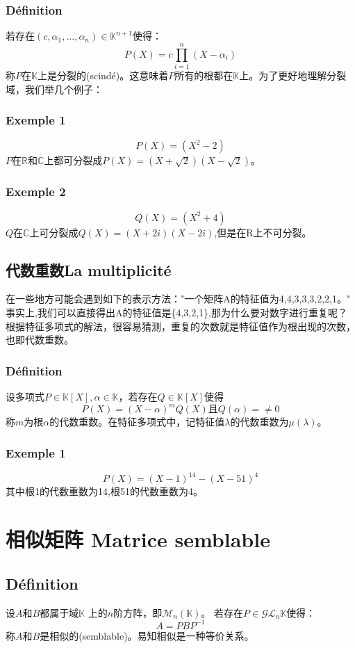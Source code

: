 \documentclass[12pt, a4paper, oneside]{ctexbook}
\begin{document}
  \subsubsection{Définition}
  若存在$(c,\alpha_1,\dots,\alpha_n)\in\mathbb{K}^{n+1}$使得：
  $$
    P(X)=c\prod_{i=1}^{n} (X-\alpha_i)
  $$
  称$P$在$\mathbb {K} $上是分裂的(scindé)。这意味着$P$所有的根都在$\mathbb {K} $上。为了更好地理解分裂域，我们举几个例子：
  \subsubsection{Exemple 1}
  $$
    P(X)=(X^2-2)
  $$
  $P$在$\mathbb {R} $和$\mathbb {C} $上都可分裂成$P(X)=(X+\sqrt{2})(X-\sqrt{2})$。
  \subsubsection{Exemple 2}
  $$
    Q(X)=(X^2+4)
  $$
  $Q$在$\mathbb {C} $上可分裂成$Q(X)=(X+2i)(X-2i)$,但是在R上不可分裂。
  \subsection{代数重数La multiplicité}
  在一些地方可能会遇到如下的表示方法："一个矩阵A的特征值为4,4,3,3,3,2,2,1。"
  事实上,我们可以直接得出A的特征值是\{4,3,2,1\},那为什么要对数字进行重复呢？
  根据特征多项式的解法，很容易猜测，重复的次数就是特征值作为根出现的次数，也即代数重数。
  \subsubsection{Définition}
  设多项式$P\in\mathbb {K} [X], \alpha\in\mathbb {K}$，若存在$Q\in\mathbb {K} [X]$使得
  $$
    P(X)=(X-\alpha)^mQ(X)\mbox{且}Q(\alpha)=\neq 0
  $$
  称$m$为根$\alpha$的代数重数。在特征多项式中，记特征值$\lambda$的代数重数为$\mu(\lambda)$。
  \subsubsection{Exemple 1}
  $$
  P(X)=(X-1)^{14}-(X-51)^4
  $$
  其中根1的代数重数为14,根51的代数重数为4。
\section{相似矩阵 Matrice semblable}
  \subsection{Définition}
  设$A$和$B$都属于域$\mathbb {K}$ 上的$n$阶方阵，即$\mathcal{M}_n(\mathbb{K})$。
  若存在$P\in\mathcal{G} \mathcal{L} _n\mathbb{K}$使得：
  $$
    A=PBP^{-1}
  $$
  称$A$和$B$是相似的(semblable)。易知相似是一种等价关系。
\end{document}
